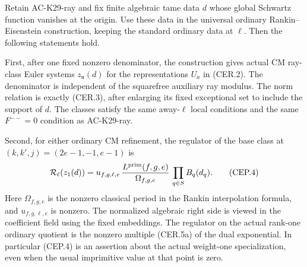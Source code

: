 \begin{lemma}
\label{AC-K29-primitive-reciprocity}
Retain AC-K29-ray and fix finite algebraic tame data $d$
whose global Schwartz function vanishes at the origin.
Use these data in the universal ordinary Rankin--Eisenstein
construction, keeping the standard ordinary data at $\ell$.
Then the following statements hold.

First, after one fixed nonzero denominator, the construction
gives actual CM ray-class Euler systems $z_{\mathfrak n}(d)$
for the representations $U_a$ in (CER.2).  The denominator
is independent of the squarefree auxiliary ray modulus.
The norm relation is exactly (CER.3), after enlarging its
fixed exceptional set to include the support of $d$.
The classes satisfy the same away-$\ell$ local conditions
and the same $F^{--}=0$ condition as AC-K29-ray.

Second, for either ordinary CM refinement, the regulator of
the base class at $(k,k',j)=(2e-1,-1,e-1)$ is
\[
 \mathcal R_\ell(z_1(d))
  =u_{f,g,\ell,e}\,
       \frac{L^{\rm prim}(f,g,e)}{\Omega_{f,g,e}}\,
       \prod_{q\in S} B_q(d_q).
                                                        \tag{CEP.4}
\]
Here $\Omega_{f,g,e}$ is the nonzero classical period in
the Rankin interpolation formula, and
$u_{f,g,\ell,e}$ is nonzero.
The normalized algebraic right side is viewed in the
coefficient field using the fixed embeddings.
The regulator on the actual rank-one ordinary quotient is
the nonzero multiple (CER.5a) of the dual exponential.
In particular (CEP.4) is an assertion about the actual
weight-one specialization, even when the usual
imprimitive value at that point is zero.
\end{lemma}
